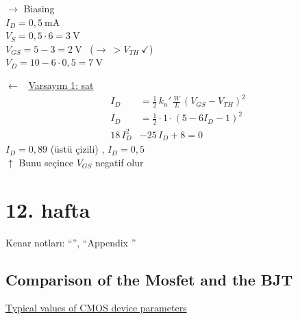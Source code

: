 \documentclass[11pt,a4paper]{article}
\begin{document}
\medskip
\noindent
\begin{minipage}[t]{0.4\linewidth}
$\rightarrow$ Biasing\\
$I_D = 0{,}5\ \mathrm{mA}$\\
$V_S = 0{,}5\cdot 6 = 3\ \mathrm{V}$\\
$V_{GS} = 5 - 3 = 2\ \mathrm{V}$ \ ($\rightarrow\ > V_{TH}\ \checkmark$)\\
$V_D = 10 - 6\cdot 0{,}5 = 7\ \mathrm{V}$
\end{minipage}\hfill
\begin{minipage}[t]{0.56\linewidth}
$\leftarrow$ \ \underline{Varsayım 1: sat}
\begin{align*}
  I_D &= \frac{1}{2}\,k_n'\,\frac{W}{L}\,(V_{GS} - V_{TH})^2\\
  I_D &= \frac{1}{2}\cdot 1\cdot(5 - 6I_D - 1)^2\\
  18\,I_D^2 &- 25\,I_D + 8 = 0
\end{align*}
$I_D = 0{,}89$ (üstü çizili) \quad , \quad $\boxed{I_D = 0{,}5}$\\
{\small $\uparrow$ Bunu seçince $V_{GS}$ negatif olur}
\end{minipage}

\section{12. hafta}
{\small\color{kursunkalem}Kenar notları: ``'', ``Appendix ''}

\subsection{Comparison of the Mosfet and the BJT}
\noindent\underline{Typical values of CMOS device parameters}
\end{document}

